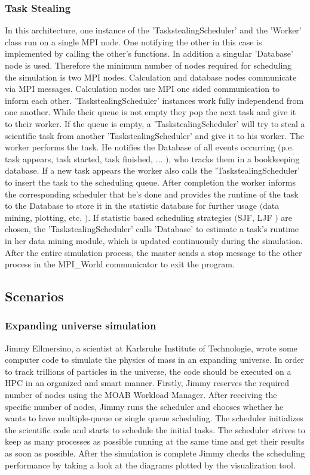 			\subsubsection{Task Stealing}
In this architecture, one instance of the 'TaskstealingScheduler' and the 'Worker' class run on a single MPI node. One notifying the other in this case is implemented by calling the other's functions. In addition a singular 'Database' node is used. Therefore the minimum number of nodes required for scheduling the simulation is two MPI nodes. Calculation and database nodes communicate via MPI messages. Calculation nodes use MPI one sided communication to inform each other.
'TaskstealingScheduler' instances work fully independend from one another. While their queue is not empty they pop the next task and give it to their worker. If the queue is empty, a 'TaskstealingScheduler' will try to steal a scientific task from another 'TaskstealingScheduler' and give it to his worker.
The worker performs the task. He notifies the Database of all events occurring $($p.e. task appears, task started, task finished, ... $)$, who tracks them in a bookkeeping database. If a new task appears the  worker also calls the 'TaskstealingScheduler' to insert the task to the scheduling queue.
After completion the worker informs the corresponding scheduler that he's done and provides the runtime of the task to the Database to store it in the statistic database for further usage $($data mining, plotting, etc. $)$.
If statistic based scheduling strategies $($SJF, LJF $)$ are chosen, the 'TaskstealingScheduler' calls 'Database' to estimate a task's runtime in her data mining module, which is updated continuously during the simulation.
After the entire simulation process, the master sends a stop message to the other process in the MPI\_World communicator to exit the program.

\newpage
\subsection{Scenarios}
			
\subsubsection{Expanding universe simulation}

Jimmy Ellmersino, a scientist at Karlsruhe Institute of Technologie, wrote some computer code to simulate the physics of mass in an expanding universe. In order to track trillions of particles in the universe, the code should be executed on a HPC in an organized and smart manner. 
Firstly, Jimmy reserves the required number of nodes using the MOAB Workload Manager. After receiving the specific number of nodes, Jimmy runs the scheduler and chooses whether he wants to have multiple-queue or single queue scheduling. The scheduler initializes the scientific code and starts to schedule the initial tasks. The scheduler strives to keep as many processes as possible running at the same time and get
their results as soon as possible. After the simulation is complete Jimmy checks the scheduling performance by taking a look at the diagrams plotted by the visualization tool.

